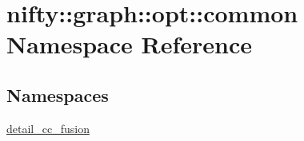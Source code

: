 \hypertarget{namespacenifty_1_1graph_1_1opt_1_1common}{}\section{nifty\+:\+:graph\+:\+:opt\+:\+:common Namespace Reference}
\label{namespacenifty_1_1graph_1_1opt_1_1common}
\subsection*{Namespaces}
\begin{DoxyCompactItemize}
\item 
 \hyperlink{namespacenifty_1_1graph_1_1opt_1_1common_1_1detail__cc__fusion}{detail\+\_\+cc\+\_\+fusion}
\end{DoxyCompactItemize}
